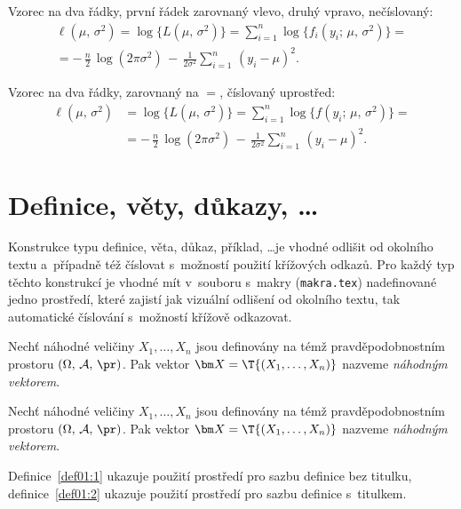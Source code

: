 Vzorec na dva řádky, první řádek zarovnaný vlevo, druhý vpravo, nečíslovaný:
\begin{multline*}
\ell(\mu,\,\sigma^2) = \log\bigl\{L(\mu,\,\sigma^2)\bigr\} =
\sum_{i=1}^n \log\bigl\{f_i(y_i;\,\mu,\,\sigma^2)\bigr\}= \\
  = -\,\frac{n}{2}\,\log(2\pi\sigma^2) \,-\,
\frac{1}{2\sigma^2}\sum_{i=1}^n\,(y_i - \mu)^2.
\end{multline*}

Vzorec na dva řádky, zarovnaný na $=$, číslovaný uprostřed:
\begin{equation}\label{eq01:ell}
\begin{split}
\ell(\mu,\,\sigma^2) &= \log\bigl\{L(\mu,\,\sigma^2)\bigr\} =
\sum_{i=1}^n \log\bigl\{f(y_i;\,\mu,\,\sigma^2)\bigr\}= \\
& = -\,\frac{n}{2}\,\log(2\pi\sigma^2) \,-\,
\frac{1}{2\sigma^2}\sum_{i=1}^n\,(y_i - \mu)^2.
\end{split}
\end{equation}

\section{Definice, věty, důkazy, \dots}

Konstrukce typu definice, věta, důkaz, příklad, \dots je vhodné
odlišit od okolního textu a~případně též číslovat s~možností použití
křížových odkazů. Pro každý typ těchto konstrukcí je vhodné mít
v~souboru s~makry (\texttt{makra.tex}) nadefinované jedno prostředí,
které zajistí jak vizuální odlišení od okolního textu, tak
automatické číslování s~možností křížově odkazovat.

\begin{definice}\label{def01:1}
  Nechť náhodné veličiny $X_1,\dots,X_n$ jsou definovány na témž
  prav\-dě\-po\-dob\-nost\-ním prostoru $(\Omega,\,\mathcal{A},\,\pr)$. Pak
  vektor $\bm X = \T{(X_1,\dots,X_n)}$ nazveme \emph{náhodným
    vektorem}.
\end{definice}

\begin{definice}\label{def01:2}
  Nechť náhodné veličiny $X_1,\dots,X_n$ jsou definovány na témž
  pravděpodobnostním prostoru $(\Omega,\,\mathcal{A},\,\pr)$. Pak
  vektor $\bm X = \T{(X_1,\dots,X_n)}$ nazveme \emph{náhodným
    vektorem}.
\end{definice}
Definice~\ref{def01:1} ukazuje použití prostředí pro sazbu definice
bez titulku, definice~\ref{def01:2} ukazuje použití prostředí pro
sazbu definice s~titulkem.

